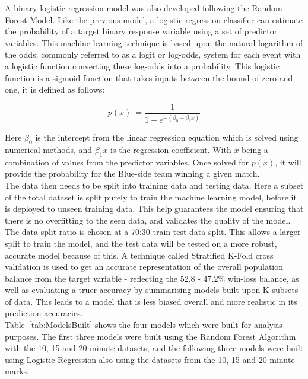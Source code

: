 A binary logistic regression model was also developed following the Random Forest Model.
Like the previous model, a logistic regression classifier can estimate the probability of a target binary response variable using a set of predictor variables.
This machine learning technique is based upon the natural logarithm of the odds;
commonly referred to as a logit or log-odds, system for each event with a logistic function converting these log-odds into a probability.
This logistic function is a sigmoid function that takes inputs between the bound of zero and one, it is defined as follows:

\[ p(x) \:= \frac{1}{1 + e^{-(\beta_0 + \beta_1 x)}} \]

Here \(\beta_{0}\) is the intercept from the linear regression equation which is solved using numerical methods, and \(\beta_{1}x\) is the regression coefficient.
With \(x\) being a combination of values from the predictor variables.
Once solved for \(p(x)\), it will provide the probability for the Blue-side team winning a given match. \\

The data then needs to be split into training data and testing data.
Here a subset of the total dataset is split purely to train the machine learning model, before it is deployed to unseen training data.
This help guarantees the model ensuring that there is no overfitting to the seen data, and validates the quality of the model.
The data split ratio is chosen at a 70:30 train-test data split.
This allows a larger split to train the model, and the test data will be tested on a more robust, accurate model because of this.
A technique called Stratified K-Fold cross validation is used to get an accurate representation of the overall population balance from the target variable - reflecting the 52.8 - 47.2\% win-loss balance, as well as evaluating a truer accuracy by summarising models built upon K subsets of data.
This leads to a model that is less biased overall and more realistic in its prediction accuracies. \\

Table~\ref{tab:ModelsBuilt} shows the four models which were built for analysis purposes.
The first three models were built using the Random Forest Algorithm with the 10, 15 and 20 minute datasets, and the following three models were built using Logistic Regression
also using the datasets from the 10, 15 and 20 minute marks.

